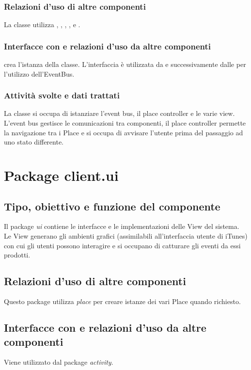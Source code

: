 \subsubsection*{Relazioni d'uso di altre componenti}
La classe utilizza , , ,
,  e
.
\subsubsection*{Interfacce con e relazioni d'uso da altre componenti}
 crea l'istanza della classe. L'interfaccia  \`e
utilizzata da  e successivamente dalle  per
l'utilizzo dell'EventBus.
\subsubsection*{Attivit\`a svolte e dati trattati}
La classe si occupa di istanziare l'event bus, il place controller e le varie
view. L'event bus gestisce le comunicazioni tra componenti, il place
controller permette la navigazione tra i Place e si occupa di avvisare
l'utente prima del passaggio ad uno stato differente.


\newpage
\section{Package client.ui} %
\subsection*{Tipo, obiettivo e funzione del componente}
Il package \emph{ui} contiene le interfacce e le implementazioni delle View del
sistema. Le View generano gli ambienti grafici (assimilabili all'interfaccia
utente di iTunes) con cui gli utenti possono interagire e si occupano di
catturare gli eventi da essi prodotti.


\subsection*{Relazioni d'uso di altre componenti}
Questo package utilizza \emph{place} per creare istanze dei vari Place quando
richiesto.

\subsection*{Interfacce con e relazioni d'uso da altre componenti}
Viene utilizzato dal package \emph{activity}.

